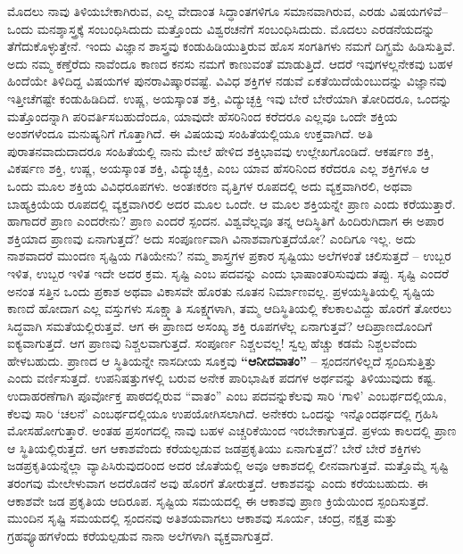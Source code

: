 ಮೊದಲು ನಾವು ತಿಳಿಯಬೇಕಾಗಿರುವ, ಎಲ್ಲ ವೇದಾಂತ ಸಿದ್ಧಾಂತಗಳಿಗೂ ಸಮಾನವಾಗಿರುವ, ಎರಡು ವಿಷಯಗಳಿವೆ–ಒಂದು ಮನಶ್ಶಾಸ್ತ್ರಕ್ಕೆ ಸಂಬಂಧಿಸಿದುದು ಮತ್ತೊಂದು ವಿಶ್ವರಚನೆಗೆ ಸಂಬಂಧಿಸಿದುದು. ಮೊದಲು ಎರಡನೆಯದನ್ನು ತೆಗೆದುಕೊಳ್ಳುತ್ತೇನೆ. ಇಂದು ವಿಜ್ಞಾನ ಶಾಸ್ತ್ರವು ಕಂಡುಹಿಡಿಯುತ್ತಿರುವ ಹೊಸ ಸಂಗತಿಗಳು ನಮಗೆ ದಿಗ್ಭ್ರಮೆ ಹಿಡಿಸುತ್ತಿವೆ. ಅದು ನಮ್ಮ ಕಣ್ತೆರೆದು ನಾವೆಂದೂ ಕಾಣದ ಕನಸು ನಮಗೆ ಕಾಣುವಂತೆ ಮಾಡುತ್ತಿದೆ. ಆದರೆ ಇವುಗಳಲ್ಲನೇಕವು ಬಹಳ ಹಿಂದೆಯೇ ತಿಳಿದಿದ್ದ ವಿಷಯಗಳ ಪುನರಾವಿಷ್ಕಾರವಷ್ಟೆ. ವಿವಿಧ ಶಕ್ತಿಗಳ ನಡುವೆ ಏಕತೆಯಿದೆಯೆಂಬುದನ್ನು ವಿಜ್ಞಾನವು ಇತ್ತೀಚೆಗಷ್ಟೇ ಕಂಡುಹಿಡಿದಿದೆ. ಉಷ್ಣ, ಅಯಸ್ಕಾಂತ ಶಕ್ತಿ, ವಿದ್ಯುಚ್ಛಕ್ತಿ ಇವು ಬೇರೆ ಬೇರೆಯಾಗಿ ತೋರಿದರೂ, ಒಂದನ್ನು ಮತ್ತೊಂದನ್ನಾಗಿ ಪರಿವರ್ತಿಸಬಹುದೆಂದೂ, ಯಾವುದೇ ಹೆಸರಿನಿಂದ ಕರೆದರೂ ಎಲ್ಲವೂ ಒಂದೇ ಶಕ್ತಿಯ ಅಂಶಗಳೆಂದೂ ಮನುಷ್ಯನಿಗೆ ಗೊತ್ತಾಗಿದೆ. ಈ ವಿಷಯವು ಸಂಹಿತೆಯಲ್ಲಿಯೂ ಉಕ್ತವಾಗಿದೆ. ಅತಿ ಪುರಾತನವಾದುದಾದರೂ ಸಂಹಿತೆಯಲ್ಲಿ ನಾನು ಮೇಲೆ ಹೇಳಿದ ಶಕ್ತಿಭಾವವು ಉಲ್ಲೇಖಗೊಂಡಿದೆ. ಆಕರ್ಷಣ ಶಕ್ತಿ, ವಿಕರ್ಷಣ ಶಕ್ತಿ, ಉಷ್ಣ, ಅಯಸ್ಕಾಂತ ಶಕ್ತಿ, ವಿದ್ಯುಚ್ಛಕ್ತಿ, ಎಂಬ ಯಾವ ಹೆಸರಿನಿಂದ ಕರೆದರೂ ಎಲ್ಲ ಶಕ್ತಿಗಳೂ ಆ ಒಂದು ಮೂಲ ಶಕ್ತಿಯ ವಿವಿಧರೂಪಗಳು. ಅಂತಃಕರಣ ವೃತ್ತಿಗಳ ರೂಪದಲ್ಲಿ ಅದು ವ್ಯಕ್ತವಾಗಿರಲಿ, ಅಥವಾ ಬಾಹ್ಯಕ್ರಿಯೆಯ ರೂಪದಲ್ಲಿ ವ್ಯಕ್ತವಾಗಿರಲಿ ಅದರ ಮೂಲ ಒಂದೇ. ಆ ಮೂಲ ಶಕ್ತಿಯನ್ನೇ ಪ್ರಾಣ ಎಂದು ಕರೆಯುತ್ತಾರೆ. ಹಾಗಾದರೆ ಪ್ರಾಣ ಎಂದರೇನು? ಪ್ರಾಣ ಎಂದರೆ ಸ್ಪಂದನ. ವಿಶ್ವವೆಲ್ಲವೂ ತನ್ನ ಆದಿಸ್ಥಿತಿಗೆ ಹಿಂದಿರುಗಿದಾಗ ಈ ಅಪಾರ ಶಕ್ತಿಯಾದ ಪ್ರಾಣವು ಏನಾಗುತ್ತದೆ? ಅದು ಸಂಪೂರ್ಣವಾಗಿ ವಿನಾಶವಾಗುತ್ತದೆಯೋ? ಎಂದಿಗೂ ಇಲ್ಲ. ಅದು ನಾಶವಾದರೆ ಮುಂದಣ ಸೃಷ್ಟಿಯ ಗತಿಯೇನು? ನಮ್ಮ ಶಾಸ್ತ್ರಗಳ ಪ್ರಕಾರ ಸೃಷ್ಟಿಯು ಅಲೆಗಳಂತೆ ಚಲಿಸುತ್ತದೆ – ಉಬ್ಬರ ಇಳಿತ, ಉಬ್ಬರ ಇಳಿತ ಇದೇ ಅದರ ಕ್ರಮ. ಸೃಷ್ಟಿ ಎಂಬ ಪದವನ್ನು  ಎಂದು ಭಾಷಾಂತರಿಸುವುದು ತಪ್ಪು. ಸೃಷ್ಟಿ ಎಂದರೆ ಅನಂತ ಸತ್ತಿನ ಒಂದು ಪ್ರಕಾಶ ಅಥವಾ ವಿಕಾಸವೇ ಹೊರತು ನೂತನ ನಿರ್ಮಾಣವಲ್ಲ. ಪ್ರಳಯಸ್ಥಿತಿಯಲ್ಲಿ ಸೃಷ್ಟಿಯ ಕಾಣದೆ ಹೋದಾಗ ಎಲ್ಲ ವಸ್ತುಗಳು ಸೂಕ್ಷ್ಮಾತಿ ಸೂಕ್ಷ್ಮಗಳಾಗಿ, ತಮ್ಮ ಆದಿಸ್ಥಿತಿಯಲ್ಲಿ ಕೆಲಕಾಲವಿದ್ದು ಹೊರಗೆ ತೋರಲು ಸಿದ್ಧವಾಗಿ ಸಮತೆಯಲ್ಲಿರುತ್ತವೆ. ಆಗ ಈ ಪ್ರಾಣದ ಅಸಂಖ್ಯ ಶಕ್ತಿ ರೂಪಗಳೆಲ್ಲ ಏನಾಗುತ್ತವೆ? ಆದಿಪ್ರಾಣದೊಂದಿಗೆ ಐಕ್ಯವಾಗುತ್ತದೆ. ಆಗ ಪ್ರಾಣವು ನಿಶ್ಚಲವಾಗುತ್ತದೆ. ಸಂಪೂರ್ಣ ನಿಶ್ಚಲವಲ್ಲ! ಸ್ವಲ್ಪ ಹೆಚ್ಚು ಕಡಮೆ ನಿಶ್ಚಲವೆಂದು ಹೇಳಬಹುದು. ಪ್ರಾಣದ ಆ ಸ್ಥಿತಿಯನ್ನೇ ನಾಸದೀಯ ಸೂಕ್ತವು \textbf{“ಆನೀದವಾತಂ”} – ಸ್ಪಂದನಗಳಿಲ್ಲದೆ ಸ್ಪಂದಿಸುತ್ತಿತ್ತು ಎಂದು ವರ್ಣಿಸುತ್ತದೆ. ಉಪನಿಷತ್ತುಗಳಲ್ಲಿ ಬರುವ ಅನೇಕ ಪಾರಿಭಾಷಿಕ ಪದಗಳ ಅರ್ಥವನ್ನು ತಿಳಿಯುವುದು ಕಷ್ಟ. ಉದಾಹರಣೆಗಾಗಿ ಪೂರ್ವೋಕ್ತ ಪಾಠದಲ್ಲಿರುವ “ವಾತಂ” ಎಂಬ ಪದವನ್ನುಕೆಲವು ಸಾರಿ ‘ಗಾಳಿ’ ಎಂಬರ್ಥದಲ್ಲಿಯೂ, ಕೆಲವು ಸಾರಿ ‘ಚಲನೆ’ ಎಂಬರ್ಥದಲ್ಲಿಯೂ ಉಪಯೋಗಿಸಲಾಗಿದೆ. ಅನೇಕರು ಒಂದನ್ನು ಇನ್ನೊಂದರ್ಥದಲ್ಲಿ ಗ್ರಹಿಸಿ ಮೋಸಹೋಗುತ್ತಾರೆ. ಅಂತಹ ಪ್ರಸಂಗದಲ್ಲಿ ನಾವು ಬಹಳ ಎಚ್ಚರಿಕೆಯಿಂದ ಇರಬೇಕಾಗುತ್ತದೆ. ಪ್ರಳಯ ಕಾಲದಲ್ಲಿ ಪ್ರಾಣ ಆ ಸ್ಥಿತಿಯಲ್ಲಿರುತ್ತದೆ. ಆಗ ಆಕಾಶವೆಂದು ಕರೆಯಲ್ಪಡುವ ಜಡಪ್ರಕೃತಿಯು ಏನಾಗುತ್ತದೆ? ಬೇರೆ ಬೇರೆ ಶಕ್ತಿಗಳು ಜಡಪ್ರಕೃತಿಯನ್ನೆಲ್ಲಾ ವ್ಯಾಪಿಸಿರುವುದರಿಂದ ಅದರ ಜೊತೆಯಲ್ಲಿ ಅವೂ ಆಕಾಶದಲ್ಲಿ ಲೀನವಾಗುತ್ತವೆ. ಮತ್ತೊಮ್ಮೆ ಸೃಷ್ಟಿ ತರಂಗವು ಮೇಲೇಳುವಾಗ ಅದರೊಡನೆ ಅವು ಹೊರಗೆ ತೋರುತ್ತದೆ. ಆಕಾಶವನ್ನು  ಎಂದು ಕರೆಯಬಹುದು. ಈ ಆಕಾಶವೇ ಜಡ ಪ್ರಕೃತಿಯ ಆದಿರೂಪ. ಸೃಷ್ಟಿಯ ಸಮಯದಲ್ಲಿ ಈ ಆಕಾಶವು ಪ್ರಾಣ ಕ್ರಿಯೆಯಿಂದ ಸ್ಪಂದಿಸುತ್ತದೆ. ಮುಂದಿನ ಸೃಷ್ಟಿ ಸಮಯದಲ್ಲಿ ಸ್ಪಂದನವು ಅತಿಶಯವಾಗಲು ಆಕಾಶವು ಸೂರ್ಯ, ಚಂದ್ರ, ನಕ್ಷತ್ರ ಮತ್ತು ಗ್ರಹವ್ಯೂಹಗಳೆಂದು ಕರೆಯಲ್ಪಡುವ ನಾನಾ ಅಲೆಗಳಾಗಿ ವ್ಯಕ್ತವಾಗುತ್ತದೆ.

